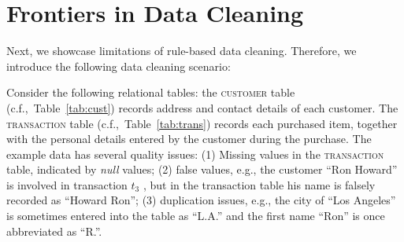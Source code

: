 \section{Frontiers in Data Cleaning}
\label{sec:frontiers}

Next, we showcase limitations of rule-based data cleaning. Therefore, we introduce the following data cleaning scenario:
\label{sec:example}
\begin{table}[h]\footnotesize
\scriptsize
{}
\vspace{-1em}
\caption{\textsc{customer} table (with errors)}
\label{tab:cust}
\end{table}

\begin{table}[h]\footnotesize
\scriptsize
{}
\vspace{-1em}
\caption{\textsc{transaction} table (with errors)}
\label{tab:trans}
\end{table}


Consider the following relational tables: the \textsc{customer} table (c.f.,~Table~\ref{tab:cust}) 
records address and contact details of each customer. The \textsc{transaction} table (c.f.,~Table~\ref{tab:trans}) 
records each purchased item, together with the personal details entered by the customer during the purchase. 
The example data has several quality issues: (1) Missing values in the \textsc{transaction} table, indicated by \emph{null} values; (2) false values, e.g.,  the customer ``Ron Howard'' is involved in transaction $t_3$ , but in the transaction table his name is falsely recorded as ``Howard Ron''; (3) duplication issues, e.g., the city of ``Los Angeles'' is sometimes entered into the table as ``L.A.'' and the first name ``Ron'' is once abbreviated as ``R.''. 

